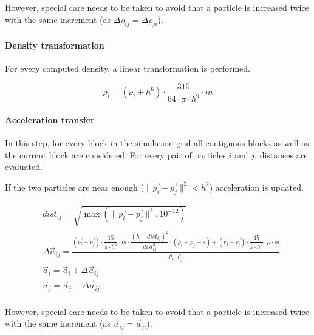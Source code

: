 However, special care needs to be taken to avoid that a particle is increased twice
with the same increment (as $\Delta \rho_{ij} = \Delta \rho_{ji}$).


\paragraph{Density transformation}
For every computed density, a linear transformation is performed.

\[
\rho_i = (\rho_i + h^6) \cdot \frac{315}{64 \cdot \pi \cdot h^9} \cdot m
\]

\paragraph{Acceleration transfer}
In this step, for every block in the simulation grid all contiguous blocks as
well as the current block are considered. For every pair of particles $i$ and
$j$, distances are evaluated.

If the two particles are near enough
($\|\vec{p_i} - \vec{p_j}\|^2 < h^2$) 
acceleration is updated.

\[
\begin{split}
& dist_{ij} = \sqrt{\max(\|\vec{p_i} - \vec{p_j}\|^2, 10^{-12})} \\
& \Delta \vec{a}_{ij} = 
  \frac{
    (\vec{p_i} - \vec{p_j}) \cdot \dfrac{15}{\pi \cdot h^6} \cdot m \cdot 
    \dfrac{(h - dist_{ij})^2}{dist_{ij}^2} \cdot (\rho_i + \rho_j - \rho) +
    (\vec{v_j} - \vec{v_i}) \cdot \dfrac{45}{\pi \cdot h^6} \cdot \mu \cdot m
  }{
    \rho_i \cdot \rho_j    
  } \\
& \vec{a}_i = \vec{a}_i + \Delta \vec{a}_{ij}\\
& \vec{a}_j = \vec{a}_j - \Delta \vec{a}_{ij}\\
\end{split}
\]

However, special care needs to be taken to avoid that a particle is increased twice
with the same increment (as $\vec{a}_{ij} = \vec{a}_{ji}$).
